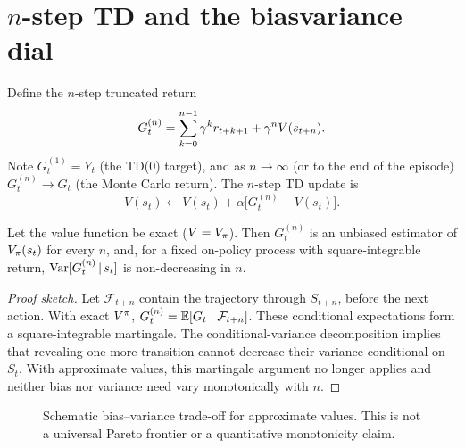\documentclass[11pt,oneside]{scrbook}
\begin{document}
\section{$n$-step TD and the bias\textendash variance dial}

Define the $n$-step truncated return
\[
  G_t^{(n)} = \sum_{k=0}^{n-1} \gamma^k r_{t+k+1} + \gamma^n V(s_{t+n}).
\]
Note $G_t^{(1)} = Y_t$ (the TD(0) target), and as $n \to \infty$ (or to the end of the
episode) $G_t^{(n)} \to G_t$ (the Monte Carlo return). The $n$-step TD update is
\[
  V(s_t) \leftarrow V(s_t) + \alpha\bigl[G_t^{(n)} - V(s_t)\bigr].
\]

\begin{proposition}
\label{prop:bv}
Let the value function be exact ($V = V_\pi$). Then $G_t^{(n)}$ is an unbiased
estimator of $V_\pi(s_t)$ for every $n$, and, for a fixed on-policy process with square-integrable return,
$\operatorname{Var}[G_t^{(n)}\,\vert\, s_t]$ is non-decreasing in $n$.
\end{proposition}

\begin{proof}[Proof sketch]
Let $\mathcal F_{t+n}$ contain the trajectory through $S_{t+n}$, before the
next action. With exact $V^\pi$, $G_t^{(n)}=\mathbb{E}[G_t\mid\mathcal F_{t+n}]$.
These conditional expectations form a square-integrable martingale. The
conditional-variance decomposition implies that revealing one more transition
cannot decrease their variance conditional on $S_t$. With approximate values,
this martingale argument no longer applies and neither bias nor variance
need vary monotonically with $n$.
\end{proof}

\begin{figure}[t]
\centering
{}
\caption{Schematic bias--variance trade-off for approximate values. This is not a
universal Pareto frontier or a quantitative monotonicity claim.}
\end{figure}
\end{document}
